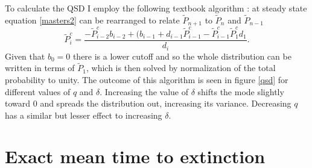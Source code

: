 To calculate the QSD I employ the following textbook algorithm \cite{Nisbet1982}: at steady state equation \ref{masters2} can be rearranged to relate $\tilde{P}_{n+1}$ to $\tilde{P}_n$ and $\tilde{P}_{n-1}$
\begin{equation}
\widetilde{P}^c_{i} = \frac{- \widetilde{P}^c_{i-2}b_{i-2} 
	+ (b_{i-1}+d_{i-1}\widetilde{P}^c_{i-1} 
	- \widetilde{P}^c_{i-1}\widetilde{P}^c_{1}d_{1}}{d_{i}}.
\end{equation}
Given that $b_0=0$ there is a lower cutoff and so the whole distribution can be written in terms of $\tilde{P}_1$, which is then solved by normalization of the total probability to unity. 
The outcome of this algorithm is seen in figure \ref{qsd} for different values of $q$ and $\delta$. 
Increasing the value of $\delta$ shifts the mode slightly toward $0$ and spreads the distribution out, increasing its variance. 
Decreasing $q$ has a similar but lesser effect to increasing $\delta$. %


\section{Exact mean time to extinction}%

